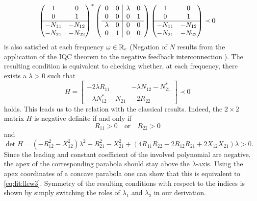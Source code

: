 \begin{equation}
\begin{pmatrix}1 &0\\0 &1\\\hline-N_{11} &-N_{12}\\-N_{21} &-N_{22}\end{pmatrix}^*
\left(\begin{array}{cc|cc}
      0&0  &\lambda &0 \\
      0&0  &0         &1\\ \hline
      \lambda &0 &0 &0\\
      0 &1 &0 &0
\end{array}\right)
\begin{pmatrix}1 &0\\0 &1\\\hline-N_{11} &-N_{12}\\-N_{21} &-N_{22}\end{pmatrix} \prec 0
\label{eq:LlewellynFDI}
\end{equation}
is also satisfied at each frequency $\omega\in\mathbb{R}_e$ (Negation of $N$ 
results from the application of the IQC theorem to the negative feedback 
interconnection ). The resulting condition is equivalent 
to checking whether, at each frequency, there exists a $\lambda > 0$ such that
\[
H = \left[
\begin{array}{cc} - 2\lambda R_{11} &  -\lambda N_{12} - N^*_{21}\\ 
-\lambda N_{12}^* - N_{21} &-2R_{22} 
\end{array}
\right]\prec 0
\]
holds. This leads us to the relation with the classical results. Indeed, 
the $2\times 2$ matrix $H$ is negative definite if and only if
\[
R_{11} > 0 \quad \text{or} \quad R_{22} > 0
\]
and
\[
\det H =  \left(-R_{12}^2 - X_{12}^2\right)\lambda^2 - R_{21}^2 - X_{21}^2 + \left(4R_{11}R_{22} - 2R_{12}R_{21} + 2X_{12}X_{21}\right)\lambda  > 0.
\]
Since the leading and constant coefficient of the involved polynomial are negative, 
the apex of the corresponding parabola should stay above the $\lambda$-axis. Using 
the apex coordinates of a concave parabola one can show that this is equivalent to 
\eqref{eq:lit:llew3}. Symmetry of the resulting conditions with respect to the indices 
is shown by simply switching the roles of $\lambda_1$ and $\lambda_2$ in our derivation.


